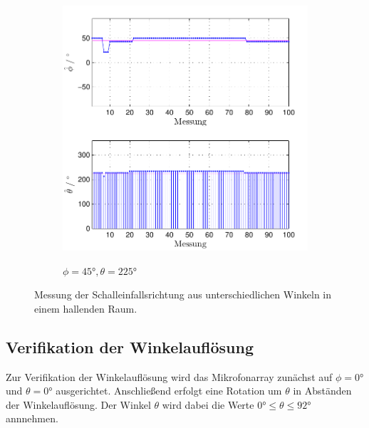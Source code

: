 \begin{figure}
\begin{subfigure}[b]{0.48\textwidth}
                \includegraphics[width=\textwidth]{grafiken/04_Echtzeitversuch/MALE_Phi_45_Theta_225}
                \label{fig:Foto_DSP_Draufsicht}
                \caption{$\phi=45°, \theta = 225°$}
        \end{subfigure}
        \caption{Messung der Schalleinfallsrichtung aus unterschiedlichen Winkeln in einem hallenden Raum.}
        \label{fig:test_echtzeit_grundfunktion}
\end{figure}



\subsection{Verifikation der Winkelauflösung}
\label{subsec:VerifikationWinkelaufloesung}
Zur Verifikation der Winkelauflösung wird das Mikrofonarray zunächst auf $\phi=0°$ und $\theta=0°$ ausgerichtet. Anschließend erfolgt eine Rotation um $\theta$ in Abständen der Winkelauflösung. Der Winkel $\theta$ wird dabei die Werte $0° \leq \theta \leq 92°$ annnehmen.
 
